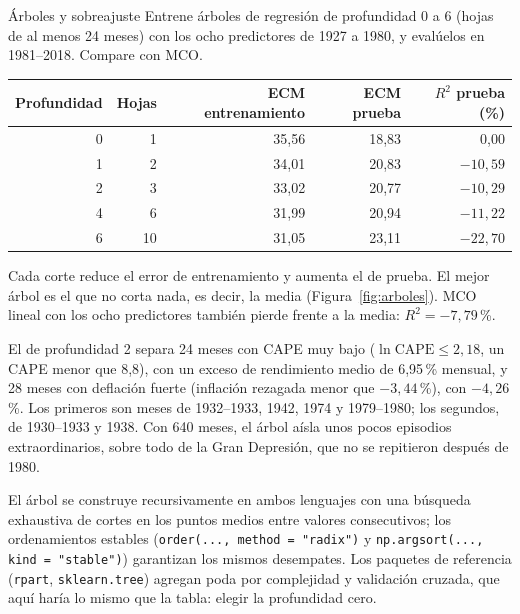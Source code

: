 \begin{ejresuelto}{Árboles y sobreajuste}\label{ej:arboles}
\enunciado Entrene árboles de regresión de profundidad 0 a 6 (hojas de al menos 24 meses) con los ocho predictores de 1927 a 1980, y evalúelos en
1981--2018. Compare con MCO.

\solucion
{}
\begin{center}\small
\begin{tabular}{@{}rrrrr@{}}
\toprule
Profundidad & Hojas & ECM entrenamiento & ECM prueba & $R^2$ prueba (\%) \\
\midrule
0 & 1 & 35,56 & 18,83 & 0,00 \\
1 & 2 & 34,01 & 20,83 & $-10{,}59$ \\
2 & 3 & 33,02 & 20,77 & $-10{,}29$ \\
4 & 6 & 31,99 & 20,94 & $-11{,}22$ \\
6 & 10 & 31,05 & 23,11 & $-22{,}70$ \\
\bottomrule
\end{tabular}
\end{center}
Cada corte reduce el error de entrenamiento y aumenta el de prueba. El mejor árbol es el que no corta nada, es decir, la media
(Figura~\ref{fig:arboles}). MCO lineal con los ocho predictores también pierde frente a la media: $R^2=-7{,}79$\,\%.

 El de profundidad 2 separa 24 meses con CAPE muy bajo ($\ln\text{CAPE}\le2{,}18$, un CAPE menor que 8,8),
con un exceso de rendimiento medio de 6,95\,\% mensual, y 28 meses con deflación fuerte (inflación rezagada menor que $-3{,}44$\,\%), con
$-4{,}26$\,\%. Los primeros son meses de 1932--1933, 1942, 1974 y 1979--1980; los segundos, de 1930--1933 y 1938. Con 640 meses, el árbol
aísla unos pocos episodios extraordinarios, sobre todo de la Gran Depresión, que no se repitieron después de 1980.


\RvsPy El árbol se construye recursivamente en ambos lenguajes con una búsqueda exhaustiva de cortes en los puntos medios entre valores
consecutivos; los ordenamientos estables (\texttt{order(..., method = "radix")} y \texttt{np.argsort(..., kind = "stable")}) garantizan los mismos
desempates. Los paquetes de referencia (\texttt{rpart}, \texttt{sklearn.tree}) agregan poda por complejidad y validación cruzada, que aquí haría
lo mismo que la tabla: elegir la profundidad cero.


\end{ejresuelto}

